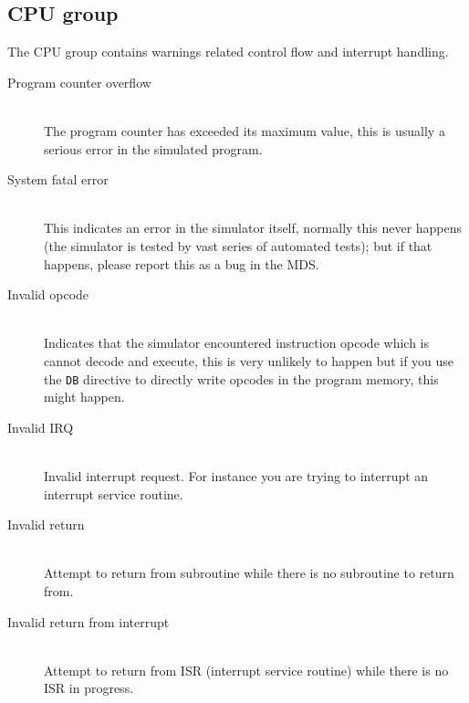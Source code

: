     \subsection{CPU group}
        The CPU group contains warnings related control flow and interrupt handling.
        \begin{description}
            \item[Program counter overflow]~\\ %
                The program counter has exceeded its maximum value, this is usually a serious error in the simulated program.
            \item[System fatal error]~\\ %
                This indicates an error in the simulator itself, normally this never happens (the simulator is tested by vast series of automated tests); but if that happens, please report this as a bug in the MDS.
            \item[Invalid opcode]~\\ %
                Indicates that the simulator encountered instruction opcode which is cannot decode and execute, this is very unlikely to happen but if you use the \texttt{DB} directive to directly write opcodes in the program memory, this might happen.
            \item[Invalid IRQ]~\\ %
                Invalid interrupt request. For instance you are trying to interrupt an interrupt service routine.
            \item[Invalid return]~\\ %
                Attempt to return from subroutine while there is no subroutine to return from.
            \item[Invalid return from interrupt]~\\ %
                Attempt to return from ISR (interrupt service routine) while there is no ISR in progress.
        \end{description}
